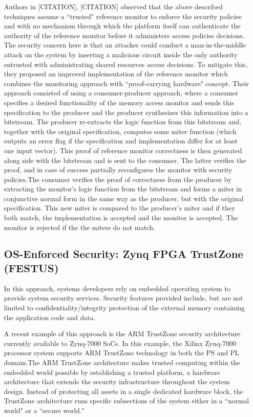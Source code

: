\documentclass[sigconf]{acmart}
\theoremstyle{plain}
\theoremstyle{remark}
\begin{document}
Authors in [CITATION], [CITATION] observed that the above described techniques assume a ``trusted" reference monitor to enforce the security policies and with no mechanism through which the platform itself can authenticate the authority of the reference monitor before it administers access policies decisions. The security concern here is that an attacker could conduct a man-in-the-middle attack on the system by inserting a malicious circuit inside the only authority entrusted with administrating shared resources access decisions. To mitigate this, they proposed an improved implementation of the reference monitor which combines the monitoring approach with ``proof-carrying hardware" concept. Their approach consisted of using a consumer-producer approach, where a consumer specifies a desired functionality of the memory access monitor and sends this specification to the producer and the producer synthesizes this information into a bitstream. The producer re-extracts the logic function from this bitstream and, together with the original specification, computes some miter function (which outputs an error flag if the specification and implementation differ for at least one input vector). This proof of reference monitor correctness is then generated along side with the bitstream and is sent to the consumer. The latter verifies the proof, and in case of success partially reconfigures the monitor with security policies.The consumer verifies the proof of correctness from the producer by extracting the monitor's logic function from the bitstream and forms a miter in conjunctive normal form in the same way as the producer, but with the original specification. This new miter is compared to the producer's miter and if they both match, the implementation is accepted and the monitor is accepted. The monitor is rejected if the the miters do not match. 
  

\subsection{OS-Enforced Security: Zynq FPGA TrustZone (FESTUS)}

In this approach, systems developers rely on embedded operating system to provide system security services. Security features provided include, but are not limited to confidentiality/integrity protection of the external memory containing the application code and data.

A recent example of this approach is the ARM TrustZone security architecture currently available to Zynq-7000 SoCs. In this example, the Xilinx Zynq-7000 processor
system supports ARM TrustZone technology in both the PS and PL domain.The ARM TrustZone architecture makes trusted computing within the embedded world possible by establishing a trusted platform, a hardware architecture that extends the security infrastructure throughout the system design. Instead of protecting all assets in a single dedicated hardware block, the TrustZone architecture runs specific subsections of the system either in a ``normal world" or a ``secure world." 
\end{document}
